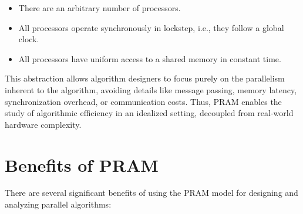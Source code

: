 \documentclass[12pt]{book}
\begin{document}
\begin{itemize}
    \item There are an arbitrary number of processors.
    \item All processors operate synchronously in lockstep, i.e., they follow a global clock.
    \item All processors have uniform access to a shared memory in constant time.
\end{itemize}

This abstraction allows algorithm designers to focus purely on the parallelism inherent to the algorithm, avoiding details like message passing, memory latency, synchronization overhead, or communication costs. Thus, PRAM enables the study of algorithmic efficiency in an idealized setting, decoupled from real-world hardware complexity.

\section{Benefits of PRAM}
There are several significant benefits of using the PRAM model for designing and analyzing parallel algorithms:
\end{document}
